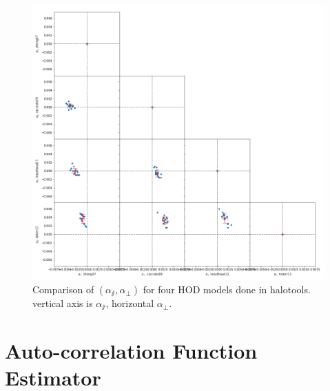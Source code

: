 \documentclass[fleqn,usenatbib]{mnras}
\begin{document}
		\begin{figure}
			\includegraphics[width=\linewidth]{alpha_pair_compare.png}
		    \caption{Comparison of $ (\alpha_\varparallel, \alpha_\perp) $ for four HOD models done in halotools. vertical axis is $\alpha_\varparallel$, horizontal $\alpha_\perp$. }
		    \label{fig:alpha_hod_compare}
		\end{figure}
		







\appendix

\section{Auto-correlation Function Estimator}
	\label{appendix_auto_correlation}
	
\end{document}
